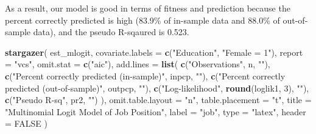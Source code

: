 \documentclass[
  12pt,
]{article}
\newenvironment{Shaded}{\begin{snugshade}}{\end{snugshade}}
\newcommand{\DataTypeTok}[1]{\textcolor[rgb]{0.13,0.29,0.53}{#1}}
\newcommand{\DecValTok}[1]{\textcolor[rgb]{0.00,0.00,0.81}{#1}}
\newcommand{\KeywordTok}[1]{\textcolor[rgb]{0.13,0.29,0.53}{\textbf{#1}}}
\newcommand{\NormalTok}[1]{#1}
\newcommand{\OtherTok}[1]{\textcolor[rgb]{0.56,0.35,0.01}{#1}}
\newcommand{\StringTok}[1]{\textcolor[rgb]{0.31,0.60,0.02}{#1}}
\begin{document}
As a result, our model is good in terms of fitness and prediction
because the percent correctly predicted is high (83.9\% of in-sample
data and 88.0\% of out-of-sample data), and the pseudo R-sqaured is
0.523.

\begin{Shaded}
\begin{Highlighting}[]
\KeywordTok{stargazer}\NormalTok{(}
\NormalTok{  est\_mlogit,}
  \DataTypeTok{covariate.labels =} \KeywordTok{c}\NormalTok{(}\StringTok{"Education"}\NormalTok{, }\StringTok{"Female = 1"}\NormalTok{),}
  \DataTypeTok{report =} \StringTok{"vcs"}\NormalTok{, }\DataTypeTok{omit.stat =} \KeywordTok{c}\NormalTok{(}\StringTok{"aic"}\NormalTok{),}
  \DataTypeTok{add.lines =} \KeywordTok{list}\NormalTok{(}
    \KeywordTok{c}\NormalTok{(}\StringTok{"Observations"}\NormalTok{, n, }\StringTok{""}\NormalTok{),}
    \KeywordTok{c}\NormalTok{(}\StringTok{"Percent correctly predicted (in{-}sample)"}\NormalTok{, inpcp, }\StringTok{""}\NormalTok{),}
    \KeywordTok{c}\NormalTok{(}\StringTok{"Percent correctly predicted (out{-}of{-}sample)"}\NormalTok{, outpcp, }\StringTok{""}\NormalTok{),}
    \KeywordTok{c}\NormalTok{(}\StringTok{"Log{-}likelihood"}\NormalTok{, }\KeywordTok{round}\NormalTok{(loglik1, }\DecValTok{3}\NormalTok{), }\StringTok{""}\NormalTok{),}
    \KeywordTok{c}\NormalTok{(}\StringTok{"Pseudo R{-}sq"}\NormalTok{, pr2, }\StringTok{""}\NormalTok{)}
\NormalTok{  ),}
  \DataTypeTok{omit.table.layout =} \StringTok{"n"}\NormalTok{, }\DataTypeTok{table.placement =} \StringTok{"t"}\NormalTok{,}
  \DataTypeTok{title =} \StringTok{"Multinomial Logit Model of Job Position"}\NormalTok{,}
  \DataTypeTok{label =} \StringTok{"job"}\NormalTok{,}
  \DataTypeTok{type =} \StringTok{"latex"}\NormalTok{, }\DataTypeTok{header =} \OtherTok{FALSE}  
\NormalTok{)}
\end{Highlighting}
\end{Shaded}
\end{document}
